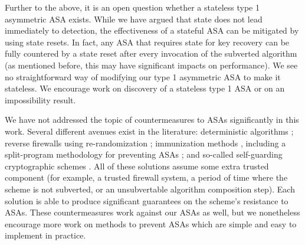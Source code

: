 Further to the above, it is an open question whether a stateless type 1 asymmetric ASA exists. While we have argued that state does not lead immediately to detection, the effectiveness of a stateful ASA can be mitigated by using state resets. In fact, any ASA that requires state for key recovery can be fully countered by a state reset after every invocation of the subverted algorithm (as mentioned before, this may have significant impacts on performance). We see no straightforward way of modifying our type 1 asymmetric ASA to make it stateless. We encourage work on discovery of a stateless type 1 ASA or on an impossibility result.

We have not addressed the topic of countermeasures to ASAs significantly in this work. Several different avenues exist in the literature: deterministic algorithms \cite{C:BelPatRog14,FSE:DegFarPoe15,CCS:BelJaeKan15}; reverse firewalls using re-randomization \cite{CCS:AteMagVen15}; immunization methods \cite{ACNS:AFMV19}, including a split-program methodology for preventing ASAs \cite{CCS:RTYZ17,AC:RTYZ16,CCS:TanYun17}; and so-called self-guarding cryptographic schemes \cite{CSF:FisMaz18}. All of these solutions assume some extra trusted component (for example, a trusted firewall system, a period of time where the scheme is not subverted, or an unsubvertable algorithm composition step). Each solution is able to produce significant guarantees on the scheme's resistance to ASAs. These countermeasures work against our ASAs as well, but we nonetheless encourage more work on methods to prevent ASAs which are simple and easy to implement in practice.
